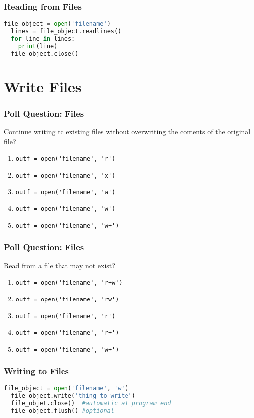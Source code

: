 \documentclass{beamer}
\begin{document}
%
%
\begin{frame}[fragile]
  \frametitle{Reading from Files}
  \begin{lstlisting}[language=Python, autogobble]
  file_object = open('filename')
  lines = file_object.readlines()
  for line in lines:
    print(line)
  file_object.close()
  \end{lstlisting}
\end{frame}

\section{Write Files}
%
%
\begin{frame}[fragile]
  \frametitle{Poll Question: Files}
  Continue writing to existing files without overwriting the contents of the original file?
  \vfill
  \begin{enumerate}[A]
    \item \lstinline|outf = open('filename', 'r')|
    \item \lstinline|outf = open('filename', 'x')|
    \item \lstinline|outf = open('filename', 'a')|
    \item \lstinline|outf = open('filename', 'w')|
    \item \lstinline|outf = open('filename', 'w+')|
  \end{enumerate}
\end{frame}

%
%
\begin{frame}[fragile]
  \frametitle{Poll Question: Files}
  Read from a file that may not exist?
  \vfill
  \begin{enumerate}[A]
    \item \lstinline|outf = open('filename', 'r+w')|
    \item \lstinline|outf = open('filename', 'rw')|
    \item \lstinline|outf = open('filename', 'r')|
    \item \lstinline|outf = open('filename', 'r+')|
    \item \lstinline|outf = open('filename', 'w+')|
  \end{enumerate}
\end{frame}



%
%
\begin{frame}[fragile]
  \frametitle{Writing to Files}
  \begin{lstlisting}[language=Python, autogobble]
  file_object = open('filename', 'w')
  file_object.write('thing to write')
  file_objet.close()  #automatic at program end
  file_object.flush() #optional
  \end{lstlisting}
\end{frame}
\end{document}
